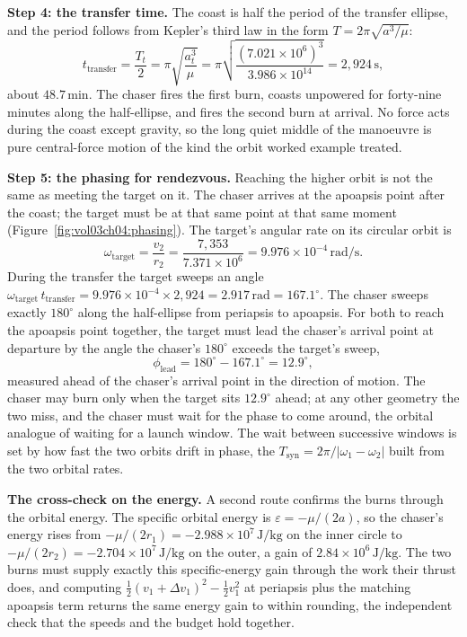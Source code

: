 \textbf{Step 4: the transfer time.} The coast is half the period of
the transfer ellipse, and the period follows from Kepler's third law in
the form $T=2\pi\sqrt{a^{3}/\mu}$:
\[
t_{\text{transfer}}=\frac{T_{t}}{2}=\pi\sqrt{\frac{a_{t}^{3}}{\mu}}
=\pi\sqrt{\frac{(7.021\times 10^{6})^{3}}{3.986\times 10^{14}}}
=2{,}924\,\si{\second},
\]
about $48.7\,\si{\minute}$. The chaser fires the first burn, coasts
unpowered for forty-nine minutes along the half-ellipse, and fires the
second burn at arrival. No force acts during the coast except gravity,
so the long quiet middle of the manoeuvre is pure central-force motion
of the kind the orbit worked example treated.

\textbf{Step 5: the phasing for rendezvous.} Reaching the higher orbit
is not the same as meeting the target on it. The chaser arrives at the
apoapsis point after the coast; the target must be at that same point at
that same moment (Figure~\ref{fig:vol03ch04:phasing}). The target's
angular rate on its circular orbit is
\[
\omega_{\text{target}}=\frac{v_{2}}{r_{2}}=\frac{7{,}353}{7.371\times
10^{6}}=9.976\times 10^{-4}\,\si{\radian\per\second}.
\]
During the transfer the target sweeps an angle $\omega_{\text{target}}
\,t_{\text{transfer}}=9.976\times 10^{-4}\times 2{,}924=2.917\,\si{
\radian}=167.1^{\circ}$. The chaser sweeps exactly $180^{\circ}$ along
the half-ellipse from periapsis to apoapsis. For both to reach the
apoapsis point together, the target must lead the chaser's arrival point
at departure by the angle the chaser's $180^{\circ}$ exceeds the
target's sweep,
\[
\phi_{\text{lead}}=180^{\circ}-167.1^{\circ}=12.9^{\circ},
\]
measured ahead of the chaser's arrival point in the direction of
motion. The chaser may burn only when the target sits $12.9^{\circ}$
ahead; at any other geometry the two miss, and the chaser must wait for
the phase to come around, the orbital analogue of waiting for a launch
window. The wait between successive windows is set by how fast the two
orbits drift in phase, the 
$T_{\text{syn}}=2\pi/|\omega_{1}-\omega_{2}|$ built from the two orbital
rates.

\textbf{The cross-check on the energy.} A second route confirms the
burns through the orbital energy. The specific orbital energy is
$\varepsilon=-\mu/(2a)$, so the chaser's energy rises from $-\mu/(2r_{1})
=-2.988\times 10^{7}\,\si{\joule\per\kilogram}$ on the inner circle to
$-\mu/(2r_{2})=-2.704\times 10^{7}\,\si{\joule\per\kilogram}$ on the
outer, a gain of $2.84\times 10^{6}\,\si{\joule\per\kilogram}$. The two
burns must supply exactly this specific-energy gain through the work
their thrust does, and computing $\tfrac{1}{2}(v_{1}+\Delta v_{1})^{2}-
\tfrac{1}{2}v_{1}^{2}$ at periapsis plus the matching apoapsis term
returns the same energy gain to within rounding, the independent check
that the speeds and the budget hold together.

